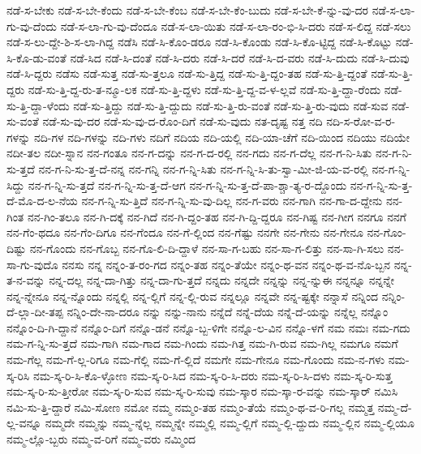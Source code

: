 {ನಡೆ-ಸ-ಬೇಕು
ನಡೆ-ಸ-ಬೇ-ಕೆಂದು
ನಡೆ-ಸ-ಬೇ-ಕೆಂಬ
ನಡೆ-ಸ-ಬೇ-ಕೆಂ-ಬುದು
ನಡೆ-ಸ-ಬೇ-ಕೆ-ನ್ನು-ವು-ದರ
ನಡೆ-ಸ-ಲಾ-ಗು-ವು-ದೆಂದು
ನಡೆ-ಸ-ಲಾ-ಗು-ವು-ದೆಂದೂ
ನಡೆ-ಸ-ಲಾ-ಯಿತು
ನಡೆ-ಸ-ಲಾ-ರಂ-ಭಿ-ಸಿ-ದರು
ನಡೆ-ಸ-ಲಿದ್ದ
ನಡೆ-ಸಲು
ನಡೆ-ಸ-ಲು-ದ್ದೇ-ಶಿ-ಸ-ಲಾ-ಗಿದ್ದ
ನಡೆಸಿ
ನಡೆ-ಸಿ-ಕೊಂ-ಡರೂ
ನಡೆ-ಸಿ-ಕೊಂಡು
ನಡೆ-ಸಿ-ಕೊ-ಟ್ಟಿದ್ದ
ನಡೆ-ಸಿ-ಕೊಟ್ಟು
ನಡೆ-ಸಿ-ಕೊ-ಡು-ವಂತೆ
ನಡೆ-ಸಿದ
ನಡೆ-ಸಿ-ದಂತೆ
ನಡೆ-ಸಿ-ದರು
ನಡೆ-ಸಿ-ದರೆ
ನಡೆ-ಸಿ-ದ-ವರು
ನಡೆ-ಸಿ-ದುದು
ನಡೆ-ಸಿ-ದುವು
ನಡೆ-ಸಿ-ದ್ದರು
ನಡೆಸು
ನಡೆ-ಸುತ್ತ
ನಡೆ-ಸು-ತ್ತಲೂ
ನಡೆ-ಸು-ತ್ತಿದ್ದ
ನಡೆ-ಸು-ತ್ತಿ-ದ್ದಂ-ತಹ
ನಡೆ-ಸು-ತ್ತಿ-ದ್ದಂತೆ
ನಡೆ-ಸು-ತ್ತಿ-ದ್ದರು
ನಡೆ-ಸು-ತ್ತಿ-ದ್ದ-ರು-ತ-ನ್ಮೂ-ಲಕ
ನಡೆ-ಸು-ತ್ತಿ-ದ್ದಳು
ನಡೆ-ಸು-ತ್ತಿ-ದ್ದ-ವ-ಳ-ಲ್ಲವೆ
ನಡೆ-ಸು-ತ್ತಿ-ದ್ದಾ-ರೆಂದು
ನಡೆ-ಸು-ತ್ತಿ-ದ್ದಾ-ಳೆಂದು
ನಡೆ-ಸು-ತ್ತಿದ್ದು
ನಡೆ-ಸು-ತ್ತಿ-ದ್ದುದು
ನಡೆ-ಸು-ತ್ತಿ-ರು-ವಂತೆ
ನಡೆ-ಸು-ತ್ತಿ-ರು-ವುದು
ನಡೆ-ಸುವ
ನಡೆ-ಸು-ವಂತೆ
ನಡೆ-ಸು-ವು-ದರ
ನಡೆ-ಸು-ವು-ದ-ರೊಂ-ದಿಗೆ
ನಡೆ-ಸು-ವುದು
ನತ-ದೃಷ್ಟ
ನತ್ತ
ನದಿ
ನದಿ-ಸ-ರೋ-ವ-ರ-ಗಳನ್ನು
ನದಿ-ಗಳ
ನದಿ-ಗಳನ್ನು
ನದಿ-ಗಳು
ನದಿಗೆ
ನದಿಯ
ನದಿ-ಯಲ್ಲಿ
ನದಿ-ಯಾ-ಚೆಗೆ
ನದಿ-ಯಿಂದ
ನದಿಯು
ನದಿಯೇ
ನದೀ-ತಲ
ನದೀ-ಸ್ನಾನ
ನನ-ಗಂತೂ
ನನ-ಗ-ದನ್ನು
ನನ-ಗ-ದ-ರಲ್ಲಿ
ನನ-ಗದು
ನನ-ಗ-ದೆಲ್ಲ
ನನ-ಗ-ನಿ-ಸಿತು
ನನ-ಗ-ನಿ-ಸು-ತ್ತದೆ
ನನ-ಗ-ನಿ-ಸು-ತ್ತ-ದೆ-ನನ್ನ
ನನ-ಗನ್ನಿ
ನನ-ಗ-ನ್ನಿ-ಸಿತು
ನನ-ಗ-ನ್ನಿ-ಸಿ-ತು-ಸ್ವಾ-ಮೀ-ಜಿ-ಯ-ವ-ರಲ್ಲಿ
ನನ-ಗ-ನ್ನಿ-ಸಿದ್ದು
ನನ-ಗ-ನ್ನಿ-ಸು-ತ್ತದೆ
ನನ-ಗ-ನ್ನಿ-ಸು-ತ್ತ-ದೆ-ಆಗ
ನನ-ಗ-ನ್ನಿ-ಸು-ತ್ತ-ದೆ-ಪಾ-ಶ್ಚಾ-ತ್ಯ-ರ-ದ್ದೊಂದು
ನನ-ಗ-ನ್ನಿ-ಸು-ತ್ತ-ದೆ-ಮೊ-ದ-ಲ-ನೆಯ
ನನ-ಗ-ನ್ನಿ-ಸು-ತ್ತಿದೆ
ನನ-ಗ-ನ್ನಿ-ಸು-ವು-ದಿಲ್ಲ
ನನ-ಗ-ವರು
ನನ-ಗಾಗಿ
ನನ-ಗಾ-ದ-ದ್ದೇನು
ನನ-ಗಿಂತ
ನನ-ಗಿಂ-ತಲೂ
ನನ-ಗಿ-ದಕ್ಕೆ
ನನ-ಗಿದೆ
ನನ-ಗಿ-ದ್ದಂ-ತಹ
ನನ-ಗಿ-ದ್ದಿ-ದ್ದರೂ
ನನ-ಗಿಷ್ಟ
ನನ-ಗೀಗ
ನನಗೂ
ನನಗೆ
ನನ-ಗೆಂ-ಥದೂ
ನನ-ಗೆಂ-ದಿಗೂ
ನನ-ಗೆಂದೂ
ನನ-ಗೆ-ಲ್ಲಿಂದ
ನನ-ಗೆಷ್ಟು
ನನಗೇ
ನನ-ಗೇನು
ನನ-ಗೇನೂ
ನನ-ಗೊಂ-ದಿಷ್ಟು
ನನ-ಗೊಂದು
ನನ-ಗೊಬ್ಬ
ನನ-ಗೊ-ಲಿ-ದಿ-ದ್ದಾಳೆ
ನನ-ಸಾ-ಗ-ಬಹು
ನನ-ಸಾ-ಗ-ಲಿತ್ತು
ನನ-ಸಾ-ಗಿ-ಸಲು
ನನ-ಸಾ-ಗು-ವುದೊ
ನನಸು
ನನ್ನ
ನನ್ನಂ-ತ-ರಂ-ಗದ
ನನ್ನಂ-ತಹ
ನನ್ನಂ-ತೆಯೇ
ನನ್ನಂ-ಥ-ವನ
ನನ್ನಂ-ಥ-ವ-ನೊ-ಬ್ಬನ
ನನ್ನ-ತ-ನ-ವನ್ನು
ನನ್ನ-ದಲ್ಲ
ನನ್ನ-ದಾ-ಗಿತ್ತು
ನನ್ನ-ದಾ-ಗು-ತ್ತದೆ
ನನ್ನದು
ನನ್ನದೇ
ನನ್ನನ್ನು
ನನ್ನ-ನ್ನುಈ
ನನ್ನನ್ನೂ
ನನ್ನನ್ನೇ
ನನ್ನ-ನ್ನೇನೂ
ನನ್ನ-ನ್ನೊಂದು
ನನ್ನಲ್ಲಿ
ನನ್ನ-ಲ್ಲಿಗೆ
ನನ್ನ-ಲ್ಲಿ-ರುವ
ನನ್ನಲ್ಲೂ
ನನ್ನವೇ
ನನ್ನ-ಷ್ಟಕ್ಕೇ
ನನ್ನಾಸೆ
ನನ್ನಿಂದ
ನನ್ನಿಂ-ದೆ-ಲ್ಲಾ-ದೀ-ತಪ್ಪ
ನನ್ನಿಂ-ದೇ-ನಾ-ದರೂ
ನನ್ನು
ನನ್ನು-ನಾನು
ನನ್ನೆದೆ
ನನ್ನೆ-ದೆಯ
ನನ್ನೆ-ದೆ-ಯನ್ನು
ನನ್ನೆಲ್ಲ
ನನ್ನೊಂ
ನನ್ನೊಂ-ದಿ-ಗಿ-ದ್ದಾನೆ
ನನ್ನೊಂ-ದಿಗೆ
ನನ್ನೊ-ಡನೆ
ನನ್ನೊ-ಬ್ಬ-ಳಿಗೇ
ನನ್ನೊ-ಲ-ವಿನ
ನನ್ನೊ-ಳಗೆ
ನಮ
ನಮಃ
ನಮ-ಗದು
ನಮ-ಗ-ನ್ನಿ-ಸು-ತ್ತದೆ
ನಮ-ಗಾಗಿ
ನಮ-ಗಾದ
ನಮ-ಗಿಂದು
ನಮ-ಗಿತ್ತ
ನಮ-ಗಿ-ರುವ
ನಮ-ಗಿಲ್ಲ
ನಮಗೂ
ನಮಗೆ
ನಮ-ಗೆಲ್ಲ
ನಮ-ಗೆ-ಲ್ಲ-ರಿಗೂ
ನಮ-ಗೆಲ್ಲಿ
ನಮ-ಗೆ-ಲ್ಲಿದೆ
ನಮಗೇ
ನಮ-ಗೇನೂ
ನಮ-ಗೊಂದು
ನಮ-ನ-ಗಳು
ನಮ-ಸ್ಕ-ರಿಸಿ
ನಮ-ಸ್ಕ-ರಿ-ಸಿ-ಕೊ-ಳ್ಳೋಣ
ನಮ-ಸ್ಕ-ರಿ-ಸಿದ
ನಮ-ಸ್ಕ-ರಿ-ಸಿ-ದರು
ನಮ-ಸ್ಕ-ರಿ-ಸಿ-ದಳು
ನಮ-ಸ್ಕ-ರಿ-ಸುತ್ತ
ನಮ-ಸ್ಕ-ರಿ-ಸು-ತ್ತೀರೋ
ನಮ-ಸ್ಕ-ರಿ-ಸುವ
ನಮ-ಸ್ಕ-ರಿ-ಸುವು
ನಮ-ಸ್ಕಾರ
ನಮ-ಸ್ಕಾ-ರ-ವನ್ನು
ನಮ-ಸ್ಕಾರ್
ನಮಿಸಿ
ನಮಿ-ಸು-ತ್ತಿ-ದ್ದಾರೆ
ನಮಿ-ಸೋಣ
ನಮೋ
ನಮ್ಮ
ನಮ್ಮಂ-ತಹ
ನಮ್ಮಂ-ತೆಯೆ
ನಮ್ಮಂ-ಥ-ವ-ರಿ-ಗಲ್ಲ
ನಮ್ಮತ್ತ
ನಮ್ಮ-ದೆ-ಲ್ಲ-ವನ್ನೂ
ನಮ್ಮದೇ
ನಮ್ಮನ್ನು
ನಮ್ಮ-ನ್ನೆಲ್ಲ
ನಮ್ಮನ್ನೇ
ನಮ್ಮಲ್ಲಿ
ನಮ್ಮ-ಲ್ಲಿಗೆ
ನಮ್ಮ-ಲ್ಲಿ-ದ್ದುದು
ನಮ್ಮ-ಲ್ಲಿನ
ನಮ್ಮ-ಲ್ಲಿಯೂ
ನಮ್ಮ-ಲ್ಲೊ-ಬ್ಬರು
ನಮ್ಮ-ವ-ರಿಗೆ
ನಮ್ಮ-ವರು
ನಮ್ಮಿಂದ
}
